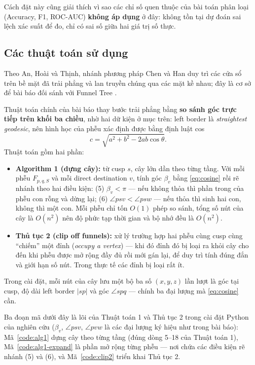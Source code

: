 Cách đặt này cũng giải thích vì sao các chỉ số quen thuộc của bài toán phân loại
(Accuracy, F1, ROC-AUC) \textbf{không áp dụng} ở đây: không tồn tại dự đoán sai
lệch xác suất để đo, chỉ có sai số giữa hai giá trị số thực.

\subsection{Các thuật toán sử dụng}

Theo An, Hoài và Thịnh, nhánh phương pháp Chen và Han duy trì các cửa sổ trên bề
mặt đã trải phẳng và lan truyền chúng qua các mặt kề nhau; đây là cơ sở để bài
báo đối sánh với Funnel Tree \cite{an2024funnel}.

Thuật toán chính của bài báo \cite{an2024funnel} thay bước trải phẳng bằng
\textbf{so sánh góc trực tiếp trên khối ba chiều}, nhờ hai dữ kiện ở mục trên:
left border là \emph{straightest geodesic}, nên hình học của phễu xác định được
bằng định luật cos
\begin{equation}
  c=\sqrt{a^2+b^2-2ab\cos\theta}.
  \label{eq:cosine}
\end{equation}
Thuật toán gồm hai phần:
\begin{itemize}
  \item \textbf{Algorithm 1 (dựng cây):} từ cusp $s$, cây lớn dần theo từng tầng.
    Với mỗi phễu $F_{p,q,S}$ và mỗi direct destination $v$, tính góc $\beta_v$
    bằng \eqref{eq:cosine} rồi rẽ nhánh theo hai điều kiện: (5) $\beta_v<\pi$ ---
    nếu không thỏa thì phần trong của phễu con rỗng và dừng lại; (6)
    $\angle psv<\angle psw$ --- nếu thỏa thì sinh hai con, không thì một con. Mỗi
    phễu chỉ tốn $O(1)$ phép so sánh, tổng số nút của cây là $O(n^2)$ nên độ phức
    tạp thời gian và bộ nhớ đều là $O(n^2)$.
  \item \textbf{Thủ tục 2 (clip off funnels):} xử lý trường hợp hai phễu cùng cusp
    cùng ``chiếm'' một đỉnh (\emph{occupy a vertex}) --- khi đó đỉnh đó bị loại ra
    khỏi cây cho đến khi phễu được mở rộng đầy đủ rồi mới gán lại, để duy trì tính
    đúng đắn và giới hạn số nút. Trong thực tế các đỉnh bị loại rất ít.
\end{itemize}
Trong cài đặt, mỗi nút của cây lưu một bộ ba số $(x,y,z)$ lần lượt là góc tại
cusp, độ dài left border $|sp|$ và góc $\angle spq$ \cite{an2024funnel} --- chính
ba đại lượng mà \eqref{eq:cosine} cần.

Ba đoạn mã dưới đây là lõi của Thuật toán 1 và Thủ tục 2 trong cài đặt Python của
nghiên cứu \cite{quangnguyen2025} ($\beta_v$, $\angle psv$, $\angle pvw$ là các
đại lượng ký hiệu như trong bài báo): Mã~\ref{code:alg1} dựng cây theo từng tầng
(đúng dòng 5--18 của Thuật toán 1), Mã~\ref{code:alg1-expand} là phần mở rộng
từng phễu --- nơi chứa các điều kiện rẽ nhánh (5) và (6), và Mã~\ref{code:clip2}
triển khai Thủ tục 2.

